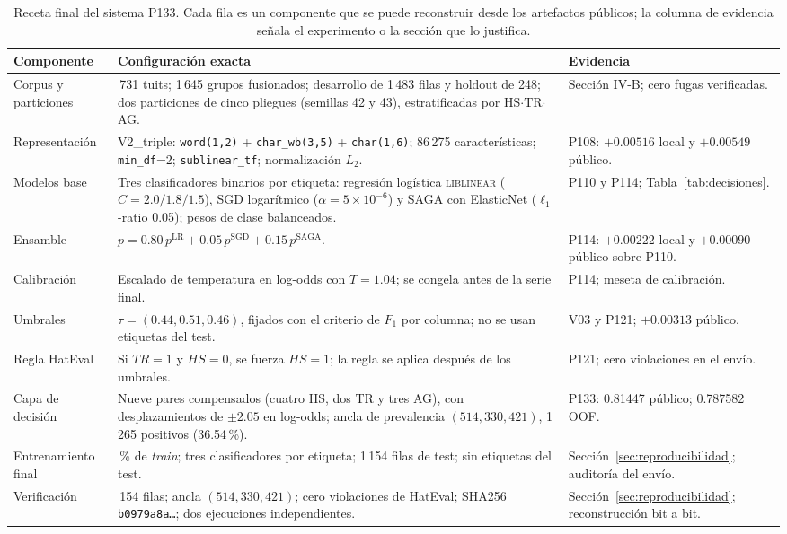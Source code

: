 \begin{table}[t]
\centering
\caption{Receta final del sistema P133. Cada fila es un componente que se
puede reconstruir desde los artefactos públicos; la columna de evidencia
señala el experimento o la sección que lo justifica.}
\label{tab:receta}
\scriptsize
\begin{tabularx}{\textwidth}{@{}>{\raggedright\arraybackslash}p{2.5cm}>{\raggedright\arraybackslash}X>{\raggedright\arraybackslash}p{2.9cm}@{}}
\toprule
Componente & Configuración exacta & Evidencia \\
\midrule
Corpus y particiones & 1\,731 tuits; 1\,645 grupos fusionados; desarrollo de 1\,483 filas y holdout de 248; dos particiones de cinco pliegues (semillas 42 y 43), estratificadas por HS$\cdot$TR$\cdot$AG. & Sección IV-B; cero fugas verificadas. \\
Representación & V2\_triple: \texttt{word(1,2)} + \texttt{char\_wb(3,5)} + \texttt{char(1,6)}; 86\,275 características; \texttt{min\_df}=2; \texttt{sublinear\_tf}; normalización $L_2$. & P108: $+0.00516$ local y $+0.00549$ público. \\
Modelos base & Tres clasificadores binarios por etiqueta: regresión logística \textsc{liblinear} ($C=2.0/1.8/1.5$), SGD logarítmico ($\alpha=5\times10^{-6}$) y SAGA con ElasticNet ($\ell_1$-ratio 0.05); pesos de clase balanceados. & P110 y P114; Tabla~\ref{tab:decisiones}. \\
Ensamble & $p=0.80\,p^{\mathrm{LR}}+0.05\,p^{\mathrm{SGD}}+0.15\,p^{\mathrm{SAGA}}$. & P114: $+0.00222$ local y $+0.00090$ público sobre P110. \\
Calibración & Escalado de temperatura en log-odds con $T=1.04$; se congela antes de la serie final. & P114; meseta de calibración. \\
Umbrales & $\tau=(0.44,0.51,0.46)$, fijados con el criterio de $F_1$ por columna; no se usan etiquetas del test. & V03 y P121; $+0.00313$ público. \\
Regla HatEval & Si $TR=1$ y $HS=0$, se fuerza $HS=1$; la regla se aplica después de los umbrales. & P121; cero violaciones en el envío. \\
Capa de decisión & Nueve pares compensados (cuatro HS, dos TR y tres AG), con desplazamientos de $\pm2.05$ en log-odds; ancla de prevalencia $(514,330,421)$, 1\,265 positivos (36.54\,\%). & P133: 0.81447 público; 0.787582 OOF. \\
Entrenamiento final & 100\,\% de \emph{train}; tres clasificadores por etiqueta; 1\,154 filas de test; sin etiquetas del test. & Sección~\ref{sec:reproducibilidad}; auditoría del envío. \\
Verificación & 1\,154 filas; ancla $(514,330,421)$; cero violaciones de HatEval; SHA256 \texttt{b0979a8a\ldots}; dos ejecuciones independientes. & Sección~\ref{sec:reproducibilidad}; reconstrucción bit a bit. \\
\bottomrule
\end{tabularx}
\end{table}

